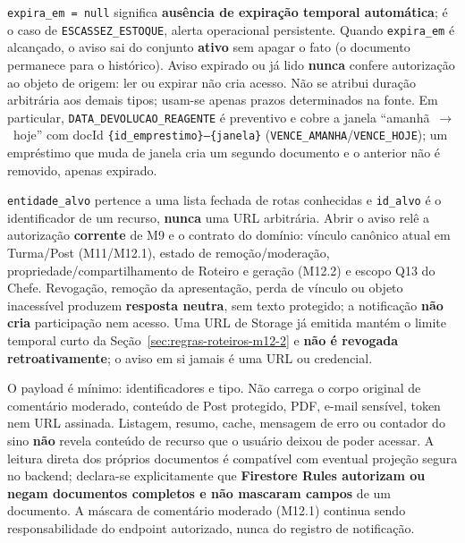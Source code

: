 \begin{regra}
\texttt{expira\_em = null} significa \textbf{ausência de expiração temporal
automática}; é o caso de \texttt{ESCASSEZ\_ESTOQUE}, alerta operacional
persistente. Quando \texttt{expira\_em} é alcançado, o aviso sai do conjunto
\textbf{ativo} sem apagar o fato (o documento permanece para o histórico).
Aviso expirado ou já lido \textbf{nunca} confere autorização ao objeto de
origem: ler ou expirar não cria acesso. Não se atribui duração arbitrária aos
demais tipos; usam-se apenas prazos determinados na fonte. Em particular,
\texttt{DATA\_DEVOLUCAO\_REAGENTE} é preventivo e cobre a janela
``amanhã~$\rightarrow$~hoje'' com docId \texttt{\{id\_emprestimo\}--\{janela\}}
(\texttt{VENCE\_AMANHA}/\texttt{VENCE\_HOJE}); um empréstimo que muda de janela
cria um segundo documento e o anterior não é removido, apenas expirado.
\end{regra}

\begin{regra}
\texttt{entidade\_alvo} pertence a uma lista fechada de rotas conhecidas e
\texttt{id\_alvo} é o identificador de um recurso, \textbf{nunca} uma URL
arbitrária. Abrir o aviso relê a autorização \textbf{corrente} de M9 e o
contrato do domínio: vínculo canônico atual em Turma/Post (M11/M12.1), estado de
remoção/moderação, propriedade/compartilhamento de Roteiro e geração (M12.2) e
escopo Q13 do Chefe. Revogação, remoção da apresentação, perda de vínculo ou
objeto inacessível produzem \textbf{resposta neutra}, sem texto protegido; a
notificação \textbf{não cria} participação nem acesso. Uma URL de Storage já
emitida mantém o limite temporal curto da Seção~\ref{sec:regras-roteiros-m12-2}
e \textbf{não é revogada retroativamente}; o aviso em si jamais é uma URL ou
credencial.
\end{regra}

\begin{regra}
O payload é mínimo: identificadores e tipo. Não carrega o corpo original de
comentário moderado, conteúdo de Post protegido, PDF, e-mail sensível, token nem
URL assinada. Listagem, resumo, cache, mensagem de erro ou contador do sino
\textbf{não} revela conteúdo de recurso que o usuário deixou de poder acessar. A
leitura direta dos próprios documentos é compatível com eventual projeção segura
no backend; declara-se explicitamente que \textbf{Firestore Rules autorizam ou
negam documentos completos e não mascaram campos} de um documento. A máscara de
comentário moderado (M12.1) continua sendo responsabilidade do endpoint
autorizado, nunca do registro de notificação.
\end{regra}

